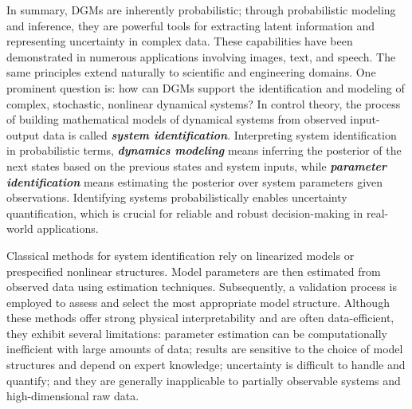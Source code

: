 In summary, \acp{DGM} are inherently probabilistic; through probabilistic modeling and inference, they are powerful tools for extracting latent information and representing uncertainty in complex data. These capabilities have been demonstrated in numerous applications involving images, text, and speech. The same principles extend naturally to scientific and engineering domains. One prominent question is: how can \acp{DGM} support the identification and modeling of complex, stochastic, nonlinear dynamical systems? In control theory, the process of building mathematical models of dynamical systems from observed input-output data is called {\bfseries\itshape system identification}. Interpreting system identification in probabilistic terms, {\bfseries\itshape dynamics modeling} means inferring the posterior of the next states based on the previous states and system inputs, while {\bfseries\itshape parameter identification} means estimating the posterior over system parameters given observations. Identifying systems probabilistically enables uncertainty quantification, which is crucial for reliable and robust decision-making in real-world applications.

Classical methods for system identification rely on linearized models or prespecified nonlinear structures. Model parameters are then estimated from observed data using estimation techniques. Subsequently, a validation process is employed to assess and select the most appropriate model structure. Although these methods offer strong physical interpretability and are often data-efficient, they exhibit several limitations: parameter estimation can be computationally inefficient with large amounts of data; results are sensitive to the choice of model structures and depend on expert knowledge; uncertainty is difficult to handle and quantify; and they are generally inapplicable to partially observable systems and high-dimensional raw data. 

